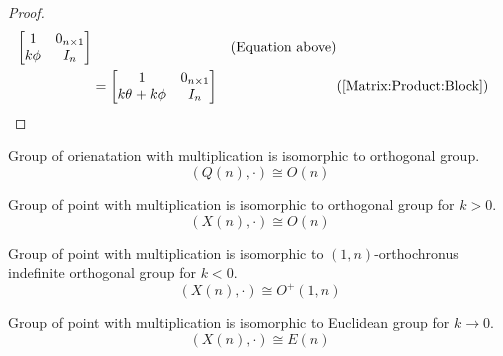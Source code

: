 \documentclass[../main.tex]{subfiles}
\begin{document}
\begin{proof}
\begin{align*}
\begin{bmatrix}
            1 & 0_{n \times1}          \\
            k\tensor{\phi}{} & I_n \\
        \end{bmatrix} && \text{(Equation above)} \\
        &=
        \begin{bmatrix}
            1 & 0_{n \times1}          \\
            k\tensor{\theta}{}+k\tensor{\phi}{} & I_n \\
        \end{bmatrix} && \text{(\cref{Matrix:Product:Block})}
    \end{align*}
\end{proof}
\begin{proposition}
    Group of orienatation with multiplication is isomorphic to orthogonal group.
    \begin{equation*}
        \left(Q\left(n\right),\cdot\right)\cong O\left(n\right)
    \end{equation*}
\end{proposition}
\begin{proposition}
    Group of point with multiplication is isomorphic to orthogonal group for $k>0$.
    \begin{equation*}
        \left(X\left(n\right),\cdot\right)\cong O\left(n\right)
    \end{equation*}
\end{proposition}
\begin{proposition}
    Group of point with multiplication is isomorphic to $\left(1,n\right)$-orthochronus indefinite orthogonal group for $k<0$.
    \begin{equation*}
        \left(X\left(n\right),\cdot\right)\cong O^+\left(1, n\right)
    \end{equation*}
\end{proposition}
\begin{proposition}
    Group of point with multiplication is isomorphic to Euclidean group for $k\to0$.
    \begin{equation*}
        \left(X\left(n\right),\cdot\right)\cong E\left(n\right)
    \end{equation*}
\end{proposition}
\end{document}
